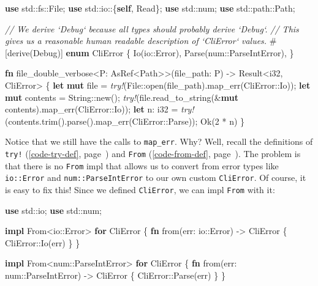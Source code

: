 \documentclass[a4paper,]{book}
\renewcommand*{\hyperref}[2][\ar]{%
  \def\ar{#2}%
  #2 (\autoref{#1}, page~\pageref{#1})}
\newenvironment{Shaded}{\begin{snugshade}}{\end{snugshade}}
\newcommand{\KeywordTok}[1]{\textcolor[rgb]{0.13,0.29,0.53}{\textbf{{#1}}}}
\newcommand{\DataTypeTok}[1]{\textcolor[rgb]{0.13,0.29,0.53}{{#1}}}
\newcommand{\DecValTok}[1]{\textcolor[rgb]{0.00,0.00,0.81}{{#1}}}
\newcommand{\ConstantTok}[1]{\textcolor[rgb]{0.00,0.00,0.00}{{#1}}}
\newcommand{\CommentTok}[1]{\textcolor[rgb]{0.56,0.35,0.01}{\textit{{#1}}}}
\newcommand{\BuiltInTok}[1]{{#1}}
\newcommand{\PreprocessorTok}[1]{\textcolor[rgb]{0.56,0.35,0.01}{\textit{{#1}}}}
\newcommand{\AttributeTok}[1]{\textcolor[rgb]{0.77,0.63,0.00}{{#1}}}
\newcommand{\NormalTok}[1]{{#1}}
\begin{document}
\begin{Shaded}
\begin{Highlighting}[]
\KeywordTok{use} \NormalTok{std::fs::File;}
\KeywordTok{use} \NormalTok{std::io::\{}\KeywordTok{self}\NormalTok{, Read\};}
\KeywordTok{use} \NormalTok{std::num;}
\KeywordTok{use} \NormalTok{std::path::Path;}

\CommentTok{// We derive `Debug` because all types should probably derive `Debug`.}
\CommentTok{// This gives us a reasonable human readable description of `CliError` values.}
\AttributeTok{#[}\NormalTok{derive}\AttributeTok{(}\BuiltInTok{Debug}\AttributeTok{)]}
\KeywordTok{enum} \NormalTok{CliError \{}
    \NormalTok{Io(io::Error),}
    \NormalTok{Parse(num::ParseIntError),}
\NormalTok{\}}

\KeywordTok{fn} \NormalTok{file_double_verbose<P: AsRef<Path>>(file_path: P) -> }\DataTypeTok{Result}\NormalTok{<}\DataTypeTok{i32}\NormalTok{, CliError> \{}
    \KeywordTok{let} \KeywordTok{mut} \NormalTok{file = }\PreprocessorTok{try!}\NormalTok{(File::open(file_path).map_err(CliError::Io));}
    \KeywordTok{let} \KeywordTok{mut} \NormalTok{contents = }\DataTypeTok{String}\NormalTok{::new();}
    \PreprocessorTok{try!}\NormalTok{(file.read_to_string(&}\KeywordTok{mut} \NormalTok{contents).map_err(CliError::Io));}
    \KeywordTok{let} \NormalTok{n: }\DataTypeTok{i32} \NormalTok{= }\PreprocessorTok{try!}\NormalTok{(contents.trim().parse().map_err(CliError::Parse));}
    \ConstantTok{Ok}\NormalTok{(}\DecValTok{2} \NormalTok{* n)}
\NormalTok{\}}
\end{Highlighting}
\end{Shaded}

Notice that we still have the calls to \texttt{map\_err}. Why? Well,
recall the definitions of \hyperref[code-try-def]{\texttt{try!}} and
\hyperref[code-from-def]{\texttt{From}}. The problem is that there is no
\texttt{From} impl that allows us to convert from error types like
\texttt{io::Error} and \texttt{num::ParseIntError} to our own custom
\texttt{CliError}. Of course, it is easy to fix this! Since we defined
\texttt{CliError}, we can impl \texttt{From} with it:

\begin{Shaded}
\begin{Highlighting}[]
\KeywordTok{use} \NormalTok{std::io;}
\KeywordTok{use} \NormalTok{std::num;}

\KeywordTok{impl} \NormalTok{From<io::Error> }\KeywordTok{for} \NormalTok{CliError \{}
    \KeywordTok{fn} \NormalTok{from(err: io::Error) -> CliError \{}
        \NormalTok{CliError::Io(err)}
    \NormalTok{\}}
\NormalTok{\}}

\KeywordTok{impl} \NormalTok{From<num::ParseIntError> }\KeywordTok{for} \NormalTok{CliError \{}
    \KeywordTok{fn} \NormalTok{from(err: num::ParseIntError) -> CliError \{}
        \NormalTok{CliError::Parse(err)}
    \NormalTok{\}}
\NormalTok{\}}
\end{Highlighting}
\end{Shaded}
\end{document}

